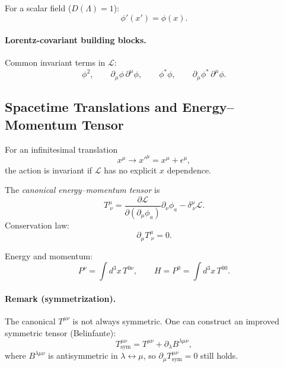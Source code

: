 For a scalar field ($D(\Lambda)=1$):
\begin{equation}
\phi'(x')=\phi(x).
\end{equation}

\paragraph{Lorentz-covariant building blocks.}
Common invariant terms in $\mathcal{L}$:
\begin{equation}
\phi^2,\qquad \partial_\mu\phi\,\partial^\mu\phi,\qquad
\phi^\ast\phi,\qquad \partial_\mu\phi^\ast\,\partial^\mu\phi.
\end{equation}

\subsection{Spacetime Translations and Energy--Momentum Tensor}
For an infinitesimal translation
\begin{equation}
x^\mu \to x'^\mu = x^\mu + \epsilon^\mu,
\end{equation}
the action is invariant if $\mathcal{L}$ has no explicit $x$ dependence.

The \emph{canonical energy--momentum tensor} is
\begin{equation}
T^{\mu}_{\ \nu}
=
\frac{\partial\mathcal{L}}{\partial(\partial_\mu\phi_a)}\partial_\nu\phi_a
-\delta^\mu_{\ \nu}\mathcal{L}.
\end{equation}
Conservation law:
\begin{equation}
\partial_\mu T^{\mu}_{\ \nu}=0.
\end{equation}

Energy and momentum:
\begin{equation}
P^\nu = \int d^3x\, T^{0\nu},
\qquad
H=P^0=\int d^3x\,T^{00}.
\end{equation}

\paragraph{Remark (symmetrization).}
The canonical $T^{\mu\nu}$ is not always symmetric.
One can construct an improved symmetric tensor (Belinfante):
\begin{equation}
T^{\mu\nu}_{\mathrm{sym}} = T^{\mu\nu} + \partial_\lambda B^{\lambda\mu\nu},
\end{equation}
where $B^{\lambda\mu\nu}$ is antisymmetric in $\lambda\leftrightarrow \mu$,
so $\partial_\mu T^{\mu\nu}_{\mathrm{sym}}=0$ still holds.

